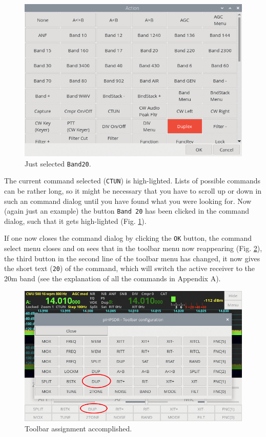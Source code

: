 \documentclass[12pt]{book}
\begin{document}
\begin{figure}[ht!]
\center
\includegraphics[scale=0.45]{ToolbarMenu3.png}
\caption{Just selected \texttt{Band20}.}
\label{fig:ToolbarMenu3}
\end{figure}

The current command selected (\texttt{CTUN}) is high-lighted. Lists of possible commands can be rather long,
so it might be necessary that you have to scroll up or down in such an command dialog until you have
found what you were looking for. Now (again just an example) the button \texttt{Band 20} has been clicked
in the command dialog, such that it gets high-lighted (Fig. \ref{fig:ToolbarMenu3}).

If one now closes the command dialog by clicking the \texttt{OK} button, the command select menu
closes and on sees that in the toolbar menu now reappearing (Fig. \ref{fig:ToolbarMenu4}), the third button
in the second
line of the toolbar menu has changed, it now gives the short text (\texttt{20}) of the command, which will
switch the active receiver to the 20m band (see the explanation of all the commands in Appendix A).

\begin{figure}[ht!]
\center
\includegraphics[scale=0.45]{ToolbarMenu4.png}
\caption{Toolbar assignment accomplished.}
\label{fig:ToolbarMenu4}
\end{figure}
\end{document}

